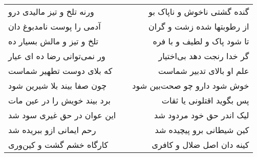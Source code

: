 \begin{center}
\begin{longtable}{l p{0.5cm} r}
ورنه تلخ و تیز مالیدی درو
&&
گنده گشتی ناخوش و ناپاک بو
\\
آدمی را پوست نامدبوغ دان
&&
از رطوبتها شده زشت و گران
\\
تلخ و تیز و مالش بسیار ده
&&
تا شود پاک و لطیف و با فره
\\
ور نمی‌توانی رضا ده ای عیار
&&
گر خدا رنجت دهد بی‌اختیار
\\
که بلای دوست تطهیر شماست
&&
علم او بالای تدبیر شماست
\\
چون صفا بیند بلا شیرین شود
&&
خوش شود دارو چو صحت‌بین شود
\\
برد بیند خویش را در عین مات
&&
پس بگوید اقتلونی یا ثقات
\\
این عوان در حق غیری سود شد
&&
لیک اندر حق خود مردود شد
\\
رحم ایمانی ازو ببریده شد
&&
کین شیطانی برو پیچیده شد
\\
کارگاه خشم گشت و کین‌وری
&&
کینه دان اصل ضلال و کافری
\\
\end{longtable}
\end{center}
